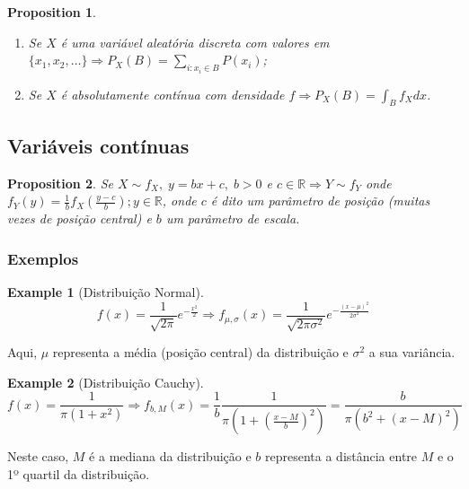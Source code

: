 \documentclass[
]{article}
\providecommand{\tightlist}{%
  \setlength{\itemsep}{0pt}\setlength{\parskip}{0pt}}
\newtheorem{proposition}{Proposition}[section]
\theoremstyle{definition}
\theoremstyle{definition}
\newtheorem{example}{Example}[section]
\theoremstyle{definition}
\theoremstyle{definition}
\theoremstyle{remark}
\begin{document}
\begin{proposition}
\leavevmode

\begin{enumerate}
\def\labelenumi{\alph{enumi})}
\tightlist
\item
  Se \(X\) é uma variável aleatória discreta com valores em \(\{x_{1},x_{2},\ldots\} \Rightarrow P_{X}(B) = \sum_{i:x_{i} \in B}P(x_{i})\);
\item
  Se \(X\) é absolutamente contínua com densidade \(f \Rightarrow P_{X}(B) = \int_{B}f_{X}dx\).
\end{enumerate}

\end{proposition}

\hypertarget{variuxe1veis-contuxednuas}{%
\subsection{Variáveis contínuas}\label{variuxe1veis-contuxednuas}}

\begin{proposition}
\protect\hypertarget{prp:transfsoma}{}\label{prp:transfsoma}Se \(X \sim f_{X}, \; y = bx+c, \; b>0\) e \(c \in \mathbb{R} \Rightarrow Y \sim f_{Y}\) onde \(f_{Y}(y) = \frac{1}{b}f_{X}(\frac{y-c}{b}); y \in \mathbb{R}\), onde \(c\) é dito um parâmetro de posição (muitas vezes de posição central) e \(b\) um parâmetro de escala.
\end{proposition}

\hypertarget{exemplos}{%
\subsubsection{Exemplos}\label{exemplos}}

\begin{example}[Distribuição Normal]
\begin{equation*}
f(x) = \frac{1}{\sqrt{2\pi}}e^{-\frac{x^{2}}{2}} \Longrightarrow f_{\mu,\sigma}(x) = \frac{1}{\sqrt{2\pi\sigma^{2}}}e^{-\frac{(x-\mu)^{2}}{2 \sigma^{2}}}
\end{equation*}

Aqui, \(\mu\) representa a média (posição central) da distribuição e \(\sigma^{2}\) a sua variância.
\end{example}

\begin{example}[Distribuição Cauchy]
\begin{equation*}
f(x) = \frac{1}{\pi(1 + x^{2})} \Longrightarrow f_{b,M}(x) = \frac{1}{b}\frac{1}{\pi\left(1+\left(\frac{x-M}{b}\right)^{2}\right)} = \frac{b}{\pi(b^{2}+(x-M)^2)}
\end{equation*}

Neste caso, \(M\) é a mediana da distribuição e \(b\) representa a distância entre \(M\) e o 1º quartil da distribuição.
\end{example}
\end{document}
